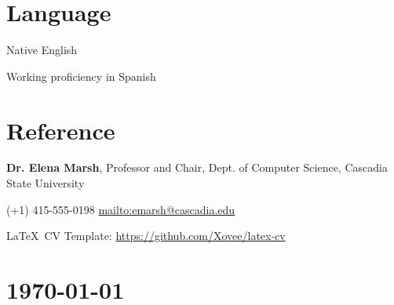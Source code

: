 \documentclass{article}
\newcommand{\cvsection}[1]{\section*{\rmfamily#1}}
\begin{document}
\cvsection{Language}

Native English

Working proficiency in Spanish


\cvsection{Reference}

\textbf{Dr. Elena Marsh}, Professor and Chair, Dept. of Computer Science, Cascadia State University

\hspace{2em}(+1) 415-555-0198 \hspace{2em} \url{mailto:emarsh@cascadia.edu}


\vfill

\noindent
\LaTeX~CV Template: \url{https://github.com/Xovee/latex-cv}

\section*{\hfill\color{OliveGreen}\today}
\end{document}
